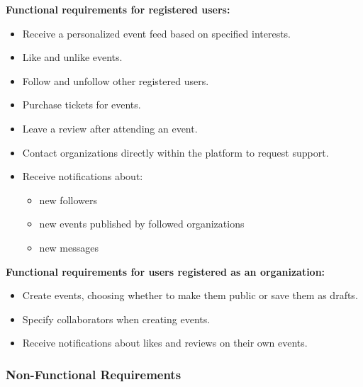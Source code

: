 \noindent\textbf{Functional requirements for registered users:}
\begin{itemize}
  \item Receive a personalized event feed based on specified interests.
  \item Like and unlike events.
  \item Follow and unfollow other registered users.
  \item Purchase tickets for events.
  \item Leave a review after attending an event.
  \item Contact organizations directly within the platform to request support.
  \item Receive notifications about:
    \begin{itemize}
      \item new followers
      \item new events published by followed organizations
      \item new messages
    \end{itemize}
\end{itemize}

\noindent\textbf{Functional requirements for users registered as an organization:}
\begin{itemize}
  \item Create events, choosing whether to make them public or save them as drafts.
  \item Specify collaborators when creating events.
  \item Receive notifications about likes and reviews on their own events.
\end{itemize}

\subsubsection{Non-Functional Requirements}

